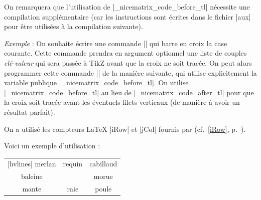 \documentclass[dvipsnames]{article}
\begin{document}
\medskip
On remarquera que l'utilisation de |\g_nicematrix_code_before_tl| nécessite une
compilation supplémentaire (car les instructions sont écrites dans le fichier
|aux| pour être utilisées à la compilation suivante).

\medskip
\emph{Exemple} : On souhaite écrire une commande |\crossbox| qui barre en croix
la case courante. Cette commande prendra en argument optionnel une liste de
couples \textsl{clé}-\textsl{valeur} qui sera passée à TikZ avant que la croix
ne soit tracée. On peut alors programmer cette commande |\crossbox| de la
manière suivante, qui utilise explicitement la variable publique
|\g_nicematrix_code_before_tl|. On utilise |\g_nicematrix_code_before_tl| au
lieu de |\g_nicematrix_code_after_tl| pour que la croix soit tracée avant les
éventuels filets verticaux (de manière à avoir un résultat parfait).



\begin{scope}

\medskip
{}


\medskip
On a utilisé les compteurs LaTeX |iRow| et |jCol| fournis par 
(cf.~\ref{iRow}, p.~\pageref{iRow}).

\medskip
Voici un exemple d'utilisation :

\medskip
\begin{Code}[width=9cm,show-output,no-cell-nodes]
\begin{NiceTabular}{ccc}[hvlines]
\CodeBefore
\Body
  merlan & requin & cabillaud \\
  baleine & \emph{\crossbox[red]} & morue \\
  mante & raie & poule
\end{NiceTabular}
\end{Code}

\end{scope}
\end{document}
